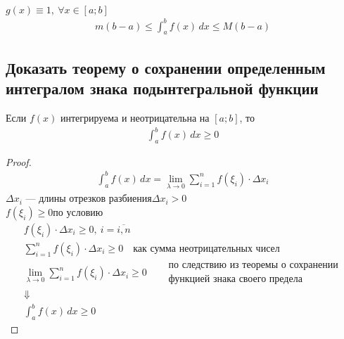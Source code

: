 \begin{corollary}
    $g(x) \equiv  1,\ \forall x \in [a;b]$
    \begin{gather*}
        m(b-a) \leqslant \int_{a}^{b} f(x)\, dx \leqslant M(b-a)
    \end{gather*}
\end{corollary}

\subsection{Доказать теорему о сохранении определенным интегралом знака подынтегральной функции}
\setcounter{theorem}{6}
\begin{theorem}
    Если $f(x)$ интегрируема и неотрицательна на $[a;b]$, то 
    \begin{gather*}
        \boxed{\int_{a}^{b} f(x)\, dx \geqslant 0}
    \end{gather*}
\end{theorem}
\begin{proof}
    \phantom{a} \vspace{-2\topsep}
    \begin{gather*}
        \int_{a}^{b} f(x)\, dx = \lim_{\lambda\to 0} \sum_{i=1}^{n} f(\xi_i)\cdot \Delta x_i
    \end{gather*}
    $\Delta x_i$ --- длины отрезков разбиения\qquad $\Delta x_i > 0$ \\
    $f(\xi_i) \geqslant 0$\quad по условию
    \begin{gather*}
        f(\xi_i)\cdot \Delta x_i \geqslant 0,\ i = \overline{i, n}\\
        \sum_{i=1}^{n} f(\xi_i)\cdot \Delta x_i \geqslant 0\quad \text{как сумма неотрицательных чисел}\\
        \lim_{\lambda \to 0} \sum_{i=1}^{n} f(\xi_i) \cdot \Delta x_i \geqslant 0\quad \begin{aligned} &\text{по следствию из теоремы } \textit{о сохранении} \\ &\textit{функцией знака своего предела} \end{aligned}\\
        \Downarrow\\
        \int_{a}^{b} f(x)\, dx \geqslant 0
    \end{gather*}
\end{proof}

\newpage
